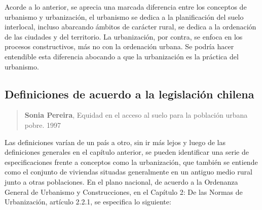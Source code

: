 Acorde a lo anterior, se aprecia una marcada diferencia entre los conceptos de urbanismo y
urbanización, el urbanismo se dedica a la planificación del suelo interlocal, incluso abarcando
ámbitos de carácter rural, se dedica a la ordenación de las ciudades y del territorio.
La urbanización, por contra, se enfoca en los procesos constructivos, más
no con la ordenación urbana. Se podría hacer entendible esta diferencia abocando a que la
urbanización es la práctica del urbanismo.



\subsection{Definiciones de acuerdo a la legislación chilena}
\begin{quote}

\textbf{Sonia Pereira}, Equidad en el acceso al suelo  para la población urbana pobre. 1997

\end{quote}

Las definiciones varían de un país a otro, sin ir más lejos y luego de las definiciones generales en
el capítulo anterior, se pueden identificar una serie de especificaciones frente a conceptos como la
urbanización, que también se entiende como el conjunto de viviendas situadas generalmente en un
antiguo medio rural junto a otras poblaciones\cite{Wkuv}.
En el plano nacional, de acuerdo a la Ordenanza General de Urbanismo y Construcciones, en el Capítulo 2: De las
Normas de Urbanización, artículo 2.2.1, se especifica lo siguiente:

